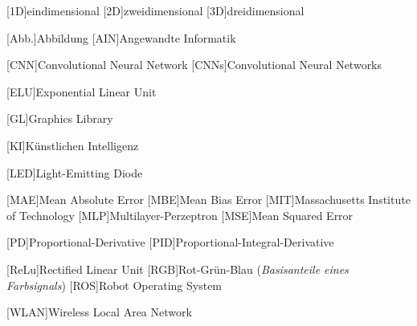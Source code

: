 
\begin{acronym}[ROS]
	[1D]{eindimensional}
	[2D]{zweidimensional}
	[3D]{dreidimensional}
	
	[Abb.]{Abbildung}
	[AIN]{Angewandte Informatik}
	
	[CNN]{Convolutional Neural Network}
	[CNNs]{Convolutional Neural Networks}
	
	[ELU]{Exponential Linear Unit}
	
	[GL]{Graphics Library}
	
	[KI]{Künstlichen Intelligenz}
	
	[LED]{Light-Emitting Diode}
	
	[MAE]{Mean Absolute Error}
	[MBE]{Mean Bias Error}
	[MIT]{Massachusetts Institute of Technology}
	[MLP]{Multilayer-Perzeptron}
	[MSE]{Mean Squared Error}
	
	[PD]{Proportional-Derivative}
	[PID]{Proportional-Integral-Derivative}
	
	[ReLu]{Rectified Linear Unit}
	[RGB]{Rot-Grün-Blau (\textit{Basisanteile eines Farbsignals})}
	[ROS]{Robot Operating System}
	
	[WLAN]{Wireless Local Area Network}
\end{acronym}
